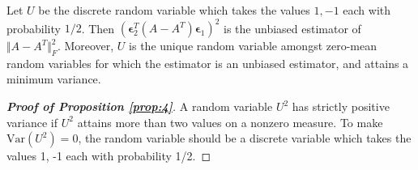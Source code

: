 \documentclass{article}
\theoremstyle{definition}
\theoremstyle{remark}
\begin{document}
	\begingroup
	\renewcommand\theproposition{5}
	\begin{proposition}
		Let $U$ be the discrete random variable which takes the values $1,-1$ each with probability $1/2$. Then $(\bm{\epsilon}_{2}^{T}(A-A^{T})\bm{\epsilon}_{1})^{2}$ is the unbiased estimator of $\Vert A-A^{T}\Vert_{F}^{2}$.
		Moreover, $U$ is the unique random variable amongst zero-mean random variables for which the estimator is an unbiased estimator, and attains a minimum variance.
	\end{proposition}
	\endgroup
	\begin{proof}[\textbf{Proof of Proposition \ref{prop:4}}]
		A random variable $U^{2}$ has strictly positive variance if $U^{2}$ attains more than two values on a nonzero measure. To make $\text{Var}(U^{2})=0$, the random variable should be a discrete variable which takes the values 1, -1 each with probability 1/2.
	\end{proof}
	
\end{document}
